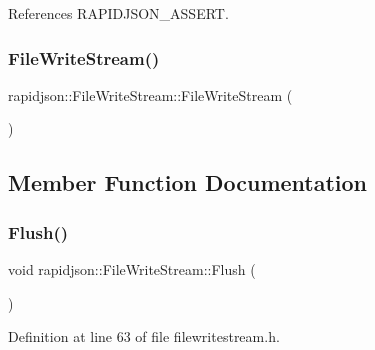 References R\+A\+P\+I\+D\+J\+S\+O\+N\+\_\+\+A\+S\+S\+E\+RT.

\mbox{\label{classrapidjson_1_1_file_write_stream_a4c3e7e34c9c31ba4dfc03da6bfde0302}} 
\subsubsection{\texorpdfstring{FileWriteStream()}{FileWriteStream()}\hspace{0.1cm}{\footnotesize\ttfamily [2/2]}}
{\footnotesize\ttfamily rapidjson\+::\+File\+Write\+Stream\+::\+File\+Write\+Stream (\begin{DoxyParamCaption}\item[{const \mbox{\hyperlink{classrapidjson_1_1_file_write_stream}{File\+Write\+Stream}} \&}]{ }\end{DoxyParamCaption})\hspace{0.3cm}{\ttfamily [private]}}



\subsection{Member Function Documentation}
\mbox{\label{classrapidjson_1_1_file_write_stream_ad21fb3d1318a91a1d32ce971378981e1}} 
\subsubsection{\texorpdfstring{Flush()}{Flush()}}
{\footnotesize\ttfamily void rapidjson\+::\+File\+Write\+Stream\+::\+Flush (\begin{DoxyParamCaption}{ }\end{DoxyParamCaption})}



Definition at line 63 of file filewritestream.\+h.


